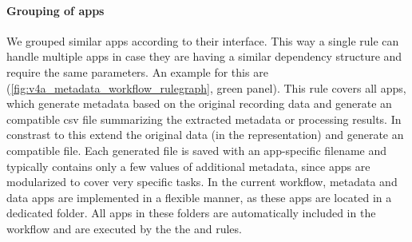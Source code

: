 \paragraph{Grouping of apps}
We grouped similar apps according to their interface. This way a single rule can handle multiple apps in case they are having a similar dependency structure and require the same parameters. An example for this are (\cref{fig:v4a_metadata_workflow_rulegraph}, green panel). This rule covers all apps, which generate metadata based on the original recording data and generate an  compatible csv file summarizing the extracted metadata or processing results. In constrast to this  extend the original data (in the  representation) and generate an  compatible  file. Each generated  file is saved with an app-specific filename and typically contains only a few values of additional metadata, since apps are modularized to cover very specific tasks.
In the current workflow, metadata and data apps are implemented in a flexible manner, as these apps are located in a dedicated folder. All apps in these folders are automatically included in the workflow and are executed by the the  and  rules.

